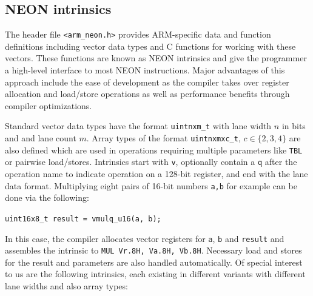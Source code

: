 \documentclass[12pt]{report}
\begin{document}
\subsection{NEON intrinsics}

The header file \texttt{<arm\_neon.h>} provides ARM-specific data and function
definitions including vector data types and C functions for working with these
vectors. These functions are known as NEON intrinsics and give the programmer a
high-level interface to most NEON instructions. Major advantages of this
approach include the ease of development as the compiler takes over register
allocation and load/store operations as well as performance benefits through
compiler optimizations.

Standard vector data types have the format \texttt{uintnxm\_t} with lane width
$n$ in bits and and lane count $m$. Array types of the format
\texttt{uintnxmxc\_t}, $c\in\{2,3,4\}$ are also defined which are used in
operations requiring multiple parameters like \texttt{TBL} or pairwise
load/stores. Intrinsics start with \texttt{v}, optionally contain a \texttt{q}
after the operation name to indicate operation on a 128-bit register, and end
with the lane data format. Multiplying eight pairs of 16-bit numbers
\texttt{a,b} for example can be done via the following:

\begin{center}
    \texttt{uint16x8\_t result = vmulq\_u16(a, b);}
\end{center}

In this case, the compiler allocates vector registers for \texttt{a},
\texttt{b} and \texttt{result} and assembles the intrinsic to \texttt{MUL
Vr.8H, Va.8H, Vb.8H}. Necessary load and stores for the result and parameters
are also handled automatically. Of special interest to us are the following
intrinsics, each existing in different variants with different lane widths and
also array types: \\
\end{document}
